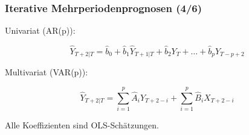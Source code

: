 \documentclass[10pt,aspectratio=169]{beamer}\usepackage[]{graphicx}\usepackage[]{xcolor}
\begin{document}
\begin{frame}
  \frametitle{Iterative Mehrperiodenprognosen \hfill (4/6)}



  Univariat (AR(p)):
  
  \[
  \widehat{Y}_{T+2|T} = \widehat{b}_0 + \widehat{b}_1 \widehat{Y}_{T+1|T} + \widehat{b}_2 Y_T + \ldots + \widehat{b}_p Y_{T-p+2}
  \]

  Multivariat (VAR(p)):
  
  \[
  \widehat{Y}_{T+2|T} = \sum_{i=1}^{p} \widehat{A}_i Y_{T+2-i} + \sum_{i=1}^{p} \widehat{B}_i X_{T+2-i}
  \]
  
  Alle Koeffizienten sind OLS-Schätzungen.
  


\end{frame}
\end{document}
